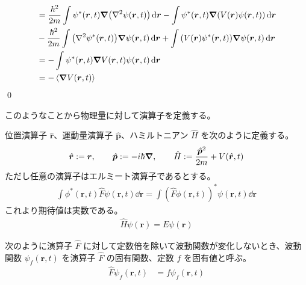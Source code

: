 \documentclass[uplatex,dvipdfmx,a4paper,11pt]{jlreq}
\makeatletter
\newcommand{\rr}{\bm{r}}
\newcommand{\pp}{\bm{p}}
\numberwithin{equation}{section}
\theoremstyle{definition}
\renewenvironment{proof}[1][\proofname]{\par
  \normalfont
  \topsep6\p@\@plus6\p@ \trivlist
  \item[\hskip\labelsep{\bfseries #1}\@addpunct{\bfseries}]\ignorespaces\quad\par
}{%
  \qed\endtrivlist\@endpefalse
}
\renewcommand\proofname{証明}
\makeatother
\begin{document}
\begin{proof}
\begin{align}
                         & = \frac{\hbar^2}{2m}\int\psi^*(\rr, t)\vnabla\qty(\nabla^2\psi(\rr, t))\dd{\rr} - \int\psi^*(\rr, t)\vnabla\qty(V(\rr)\psi(\rr, t))\dd{\rr}                                                      \\
                         & - \frac{\hbar^2}{2m}\int\qty(\nabla^2\psi^*(\rr, t))\vnabla\psi(\rr, t)\dd{\rr} + \int\qty(V(\rr)\psi^*(\rr, t))\vnabla\psi(\rr, t)\dd{\rr}                                                      \\
                         & = - \int\psi^*(\rr, t)\vnabla V(\rr, t)\psi(\rr, t)\dd{\rr}                                                                                                                                      \\
                         & = - \ev{\vnabla V(\rr, t)}
  \end{align}
\end{proof}

このようなことから物理量に対して演算子を定義する。
\begin{definition}
  位置演算子 $\hat{\rr}$、運動量演算子 $\hat{\pp}$、ハミルトニアン $\hat{H}$ を次のように定義する。
  \begin{align}
    \hat{\rr} := \rr, \qquad \hat{\pp} := -i\hbar\vnabla, \qquad \hat{H} := \frac{\hat{\pp}^2}{2m} + V(\hat{\rr}, t)
  \end{align}
  ただし任意の演算子はエルミート演算子であるとする。
  \begin{align}
    \int\phi^*(\rr, t)\hat{F}\psi(\rr, t)\dd{\rr} = \int(\hat{F}\phi(\rr, t))^*\psi(\rr, t)\dd{\rr}
  \end{align}
  これより期待値は実数である。
  \begin{align}
    \hat{H}\psi(\rr) = E\psi(\rr)
  \end{align}
\end{definition}

\begin{definition}
  次のように演算子 $\hat{F}$ に対して定数倍を除いて波動関数が変化しないとき、波動関数 $\psi_f(\rr, t)$ を演算子 $\hat{F}$ の固有関数、定数 $f$ を固有値と呼ぶ。
  \begin{align}
    \hat{F}\psi_f(\rr, t) & = f\psi_f(\rr, t)
  \end{align}
\end{definition}
\end{document}
